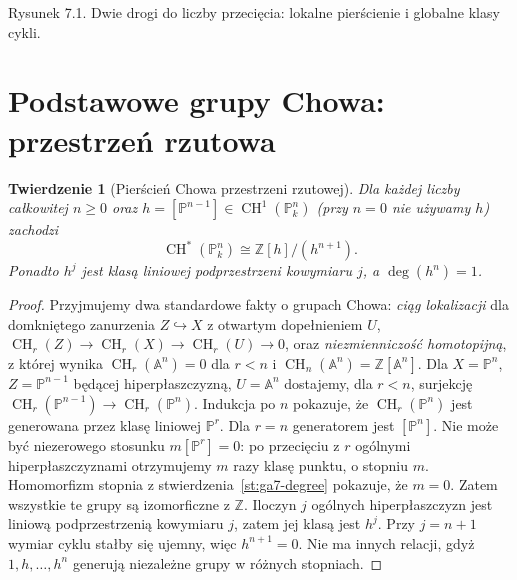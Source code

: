 \documentclass[11pt,a4paper,openany]{report}
\numberwithin{equation}{section}
\theoremstyle{plain}
\newtheorem{twierdzenie}{Twierdzenie}[section]
\theoremstyle{definition}
\theoremstyle{remark}
\newcommand{\Z}{\mathbb Z}
\newcommand{\A}{\mathbb A}
\newcommand{\PP}{\mathbb P}
\begin{document}
\begin{center}
\begin{minipage}{\linewidth}
\centering
{}

{\small Rysunek 7.1. Dwie drogi do liczby przecięcia: lokalne pierścienie i globalne klasy cykli.}
\end{minipage}
\end{center}

\section{Podstawowe grupy Chowa: przestrzeń rzutowa}
\label{sec:ga7-projective-chow}

\begin{twierdzenie}[Pierścień Chowa przestrzeni rzutowej]
\label{tw:ga7-chow-pn}
Dla każdej liczby całkowitej $n\ge0$ oraz
$h=[\PP^{n-1}]\in\operatorname{CH}^1(\PP^n_k)$
(przy $n=0$ nie używamy $h$) zachodzi
\[
\operatorname{CH}^*(\PP^n_k)\cong\Z[h]/(h^{n+1}).
\]
Ponadto $h^j$ jest klasą liniowej podprzestrzeni
kowymiaru $j$, a $\deg(h^n)=1$.
\end{twierdzenie}
\begin{proof}
Przyjmujemy dwa standardowe fakty o grupach Chowa:
\emph{ciąg lokalizacji} dla domkniętego zanurzenia
$Z\hookrightarrow X$ z otwartym dopełnieniem $U$,
$\operatorname{CH}_r(Z)\to\operatorname{CH}_r(X)
\to\operatorname{CH}_r(U)\to0$, oraz
\emph{niezmienniczość homotopijną}, z której wynika
$\operatorname{CH}_r(\A^n)=0$ dla $r<n$ i
$\operatorname{CH}_n(\A^n)=\Z[\A^n]$.
Dla $X=\PP^n$, $Z=\PP^{n-1}$ będącej hiperpłaszczyzną,
$U=\A^n$ dostajemy, dla $r<n$, surjekcję
$\operatorname{CH}_r(\PP^{n-1})\to\operatorname{CH}_r(\PP^n)$.
Indukcja po $n$ pokazuje, że $\operatorname{CH}_r(\PP^n)$
jest generowana przez klasę liniowej $\PP^r$.
Dla $r=n$ generatorem jest $[\PP^n]$.
Nie może być niezerowego stosunku $m[\PP^r]=0$:
po przecięciu z $r$ ogólnymi hiperpłaszczyznami otrzymujemy
$m$ razy klasę punktu, o stopniu $m$.
Homomorfizm stopnia z
stwierdzenia~\ref{st:ga7-degree} pokazuje, że $m=0$.
Zatem wszystkie te grupy są izomorficzne z $\Z$.
Iloczyn $j$ ogólnych hiperpłaszczyzn jest liniową
podprzestrzenią kowymiaru $j$, zatem jej klasą jest $h^j$.
Przy $j=n+1$ wymiar cyklu stałby się ujemny, więc
$h^{n+1}=0$. Nie ma innych relacji, gdyż
$1,h,\ldots,h^n$ generują niezależne grupy
w różnych stopniach.
\end{proof}
\end{document}
